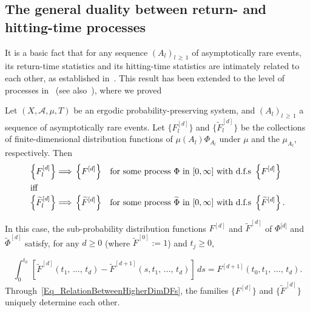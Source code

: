 \documentclass[AHL,Unicode,longabstracts]{cedram}
\newcommand{\clA}{\mathcal{A}}
\begin{document}
\subsection{The general duality between return- and hitting-time processes}
It is a basic fact that for any sequence $(A_{l})_{l\,\geq\,1}$ of asymptotically rare events, its return-time statistics and its hitting-time statistics are intimately related to each other, as established in~\cite{HaydnLacVai05}. This result has been extended to the level of processes in~\cite{Z11} (see also~\cite{Ma}), where we proved

\begin{theo}\label{T_HittingTimeVsReturnTimeProc}
Let $(X,\clA,\mu,T)$ be an ergodic probability-preserving system, and $(A_{l})_{l\,\geq\,1}$ a sequence of asymptotically rare events. Let $\{F_{l}^{[d]}\}$ and $\{\widetilde{F} _{l}^{[d]}\}$ be the collections of finite-dimensional distribution functions of $\mu(A_{l})\Phi_{A_{l}}$ under $\mu$ and the $\mu_{A_{l}}$, respectively. Then
\begin{align}
\left\{F_{l}^{[d]}\right\}\Longrightarrow\,\left\{F^{[d]}\right\}\quad &\text{for some process } \Phi\text{ in }[0,\infty]\text{ with d.f.s }\left\{F^{[d]}\right\}\label{Eq_CgeOfHittingProc}
\\
\intertext{iff}
\left\{\widetilde{F}_{l}^{[d]}\right\}\Longrightarrow\,
\left\{\widetilde{F}^{[d]}\right\}\quad &\text{for some process }\widetilde{\Phi}\text{ in }[0,\infty]\text{ with d.f.s }
\left\{\widetilde{F}^{[d]}\right\}.\label{Eq_CgeOfRetProc} 
\end{align}

In this case, the sub-probability distribution functions $F^{[d]}$ and $\widetilde{F}^{[d]}$ of $\Phi^{\lbrack d]}$ and \linebreak$\widetilde{\Phi}^{[d]}$ satisfy, for any $d\geq0$ (where $\widetilde{F}^{[0]}:=1$) and $t_{j}\geq0$,

\begin{equation}\label{Eq_RelationBetweenHigherDimDFs}
{\textstyle\int_{0}^{t_{0}}}
\,\left[\widetilde{F}^{[d]}\left(t_{1},\,\ldots,\,t_{d}\right)-\widetilde{F}^{[d+1]} \left(s,t_{1},\,\ldots,\,t_{d}\right)\right]\,ds=F^{[d+1]}\left(t_{0},t_{1},\,\ldots,\,t_{d}\right).
\end{equation}
Through~\eqref{Eq_RelationBetweenHigherDimDFs}, the families $\{F^{[d]}\}$ and $\{\widetilde{F}^{[d]}\}$ uniquely determine each other.
\end{theo}
\end{document}
